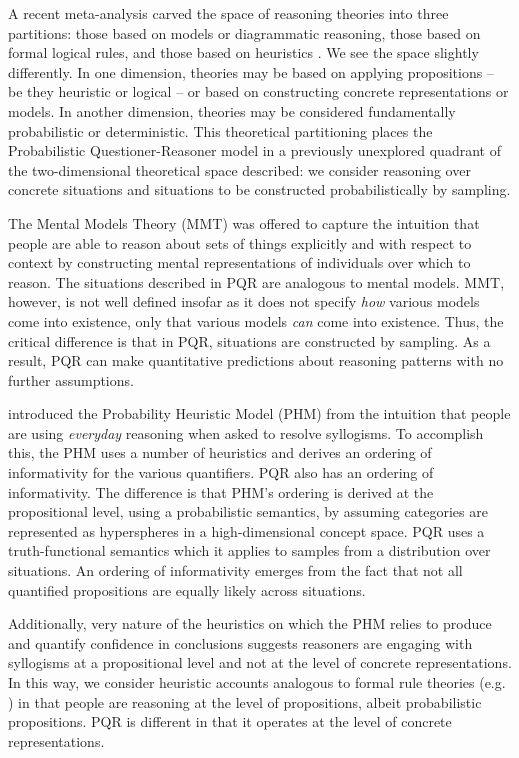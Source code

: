 \documentclass[10pt,letterpaper]{article}
\begin{document}
A recent meta-analysis carved the space of reasoning theories into three partitions: those based on models or diagrammatic reasoning, those based on formal logical rules, and those based on heuristics \cite{Khemlani2012}. We see the space slightly differently. In one dimension, theories may be based on applying propositions -- be they heuristic or logical -- or based on constructing concrete representations or models. In another dimension, theories may be considered fundamentally probabilistic or deterministic. This theoretical partitioning places the Probabilistic Questioner-Reasoner model in a previously unexplored quadrant of the two-dimensional theoretical space described: we consider reasoning over concrete situations and situations to be constructed probabilistically by sampling.

The Mental Models Theory (MMT) was offered to capture the intuition that people are able to reason about sets of things explicitly and with respect to context by constructing mental representations of individuals over which to reason. The situations described in PQR are analogous to mental models. MMT, however, is not well defined insofar as it does not specify \emph{how} various models come into existence, only that various models \emph{can} come into existence. Thus, the critical difference is that in PQR, situations are constructed by sampling. As a result, PQR can make quantitative predictions about reasoning patterns with no further assumptions. 

 introduced the Probability Heuristic Model (PHM) from the intuition that people are using \emph{everyday} reasoning when asked to resolve syllogisms. To accomplish this, the PHM uses a number of heuristics and derives an ordering of informativity for the various quantifiers. PQR also has an ordering of informativity. The difference is that PHM's ordering is derived at the propositional level, using a probabilistic semantics, by assuming categories are represented as hyperspheres in a high-dimensional concept space. PQR uses a truth-functional semantics which it applies to samples from a distribution over situations. An ordering of informativity emerges from the fact that not all quantified propositions are equally likely across situations.

Additionally, very nature of the heuristics on which the PHM relies to produce and quantify confidence in conclusions suggests reasoners are engaging with syllogisms at a propositional level and not at the level of concrete representations. In this way, we consider heuristic accounts analogous to formal rule theories (e.g. ) in that people are reasoning at the level of propositions, albeit probabilistic propositions. PQR is different in that it operates at the level of concrete representations.
\\
\end{document}
